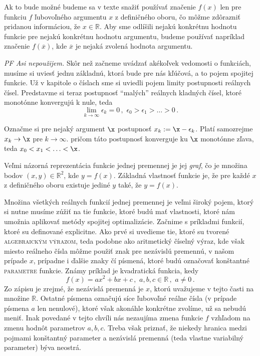 Ak to bude možné budeme sa v texte  snažiť používať značenie $f(x)$ len pre funkciu $f$ ľubovoľného argumentu $x$ z definičného oboru, čo môžme zdôrazniť pridanou informáciou, že $x \in \mathbb{R}$. Aby sme odlíšili nejakú konkrétnu hodnotu funkcie pre nejakú konkrétnu hodnotu argumentu, budeme používať napríklad značenie $f(\overline x)$, kde $\overline x$ je nejaká zvolená hodnota argumentu.

\begin{pz}
{\it PF Asi nepoužijem.}
Skôr než začneme uvádzať akékoľvek vedomosti o funkciách, musíme si uviesť jednu základnú, ktorá bude pre nás kľúčová, a to pojem spojitej funkcie. Už v kapitole o číslach sme si uviedli pojem limity postupnosti reálnych čísel. Predstavme si teraz postupnosť ``malých'' reálnych kladných čísel, ktoré monotónne konvergujú k nule, teda
\begin{equation}
\label{limitaargumentu}
\lim_{k \rightarrow \infty} \epsilon_k = 0 \,, \,\, \epsilon_0 > \epsilon_1 > \ldots > 0 \,.
\end{equation}

Označme si pre nejaký argument $\x$ postupnosť $x_k := \x - \epsilon_k$. Platí samozrejme $x_k \rightarrow \x$ pre $k \rightarrow \infty$. pričom táto postupnosť konverguje ku $\x$ monotónne zľava, teda $x_0 < x_1 < \ldots <\x$.
\end{pz}

Veľmi názorná reprezentácia funkcie jednej premennej je jej {\it graf}, čo je množina bodov $(x,y) \in \mathbb{R}^2$, kde $y=f(x)$. Základná vlastnosť funkcie je, že pre každé $x$ z definičného oboru existuje jediné $y$ také, že $y=f(x)$.

Množina všetkých reálnych funkcií jednej premennej je veľmi široký pojem, ktorý si nutne musíme zúžiť na tie funkcie, ktoré budú mať vlastnosti, ktoré nám umožnia aplikovať metódy spojitej optimalizácie. 
Začnime s príkladmi funkcií, ktoré su definované explicitne. Ako prvé si uvedieme tie, ktoré su tvorené \textsc{algebraickým výrazom}, teda podobne ako aritmetický číselný výraz, kde však miesto reálneho čísla môžme použiť znak pre nezávislú premennú, v našom prípade $x$, prípadne i ďalšie znaky čí písmená, ktoré budú označovať konštantné \textsc{parametre} funkcie. Známy príklad je kvadratická funkcia,  kedy
\begin{equation}
\label{kvadraticka}
f(x)=a x^2+b x+c \,, \,\, a,b,c \in \mathbb{R} \,, \,\, a \neq 0 \,.
\end{equation}
Zo zápisu je zrejmé, že nezávislá premenná je $x$, ktorú uvažujeme v tejto časti na množine $\mathbb{R}$. Ostatné písmena označujú síce ľubovoľné reálne čísla (v prípade písmena $a$ len nenulové), ktoré však akonáhle  konkrétne zvolíme, už sa nebudú meniť. Inak povedané v tejto chvíli nás nezaujíma zmena funkcie $f$ vzhľadom na zmenu hodnôt parametrov $a, b, c$. Treba však priznať, že niekedy hranica medzi pojmami konštantný parameter a nezávislá premenná (teda vlastne variabilný parameter) býva  neostrá.

